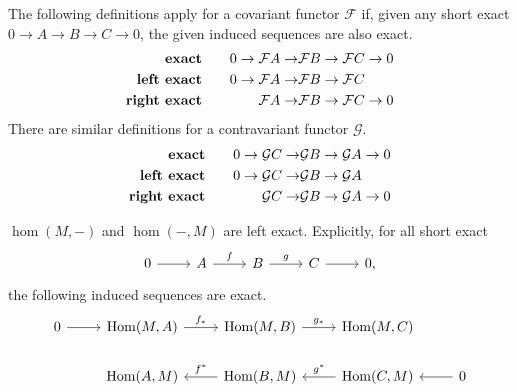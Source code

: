 \documentclass[twoside,10pt]{report}
\begin{document}
\begin{defn}[]
The following definitions apply for a covariant functor $\mathcal{F}$ if, given any short exact $0\to A\to B\to C\to 0$, the given induced sequences are also exact.
\begin{equation*}
	\begin{aligned}[c]
		\text{\textbf{exact}}\qquad \\
		\text{\textbf{left exact}}\qquad \\
		\text{\textbf{right exact}}\qquad
	\end{aligned}
	\begin{aligned}[c]
		0\to \mathcal{F}A\to &\mathcal{F}B\to \mathcal{F}C\to 0\\
		0\to \mathcal{F}A\to &\mathcal{F}B\to \mathcal{F}C\\
		\mathcal{F}A\to &\mathcal{F}B\to \mathcal{F}C\to 0
	\end{aligned}
\end{equation*}
There are similar definitions for a contravariant functor $\mathcal{G}$.
\begin{equation*}
        \begin{aligned}[c]
                \text{\textbf{exact}}\qquad \\
                \text{\textbf{left exact}}\qquad \\
                \text{\textbf{right exact}}\qquad
        \end{aligned}
        \begin{aligned}[c]
                0\to \mathcal{G}C\to &\mathcal{G}B\to \mathcal{G}A\to 0\\
                0\to \mathcal{G}C\to &\mathcal{G}B\to \mathcal{G}A\\
                \mathcal{G}C\to &\mathcal{G}B\to \mathcal{G}A\to 0
        \end{aligned}
\end{equation*}
\end{defn}

\begin{thrm}[]
	$\hom(M,-)$ and $\hom(-,M)$ are left exact. Explicitly, for all short exact
\[
        \begin{tikzcd}
                0 \rar & A \rar{f} & B\rar{g} & C \rar & 0,
        \end{tikzcd}
\] the following induced sequences are exact.
\[
\begin{tikzcd}
        0 \rar & \hom(M,A) \rar{f_{*}} & \hom(M,B) \rar{g_{*}} & \hom(M,C) \\
               & \hom(A,M) & \hom(B,M)\lar["f^{*}"'] & \hom(C,M)\lar["g^{*}"'] & 0\lar
\end{tikzcd}
\]
\end{thrm}
\end{document}
